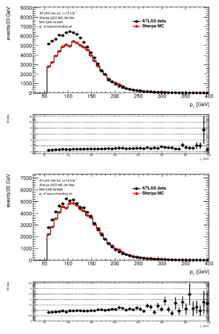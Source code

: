 \begin{figure}[phtb!]
  \begin{center}
  \begin{subfigure}[$bbb$ 3 jet category]{0.3\textwidth}\includegraphics[width=\textwidth]{MonteCarlo/figures/pt1_bbb_3jets.eps}\end{subfigure}
  \begin{subfigure}[$bbb$ 4 jet category]{0.3\textwidth}\includegraphics[width=\textwidth]{MonteCarlo/figures/pt1_bbb_4jets.eps}\end{subfigure}

\end{center}
\end{figure}
